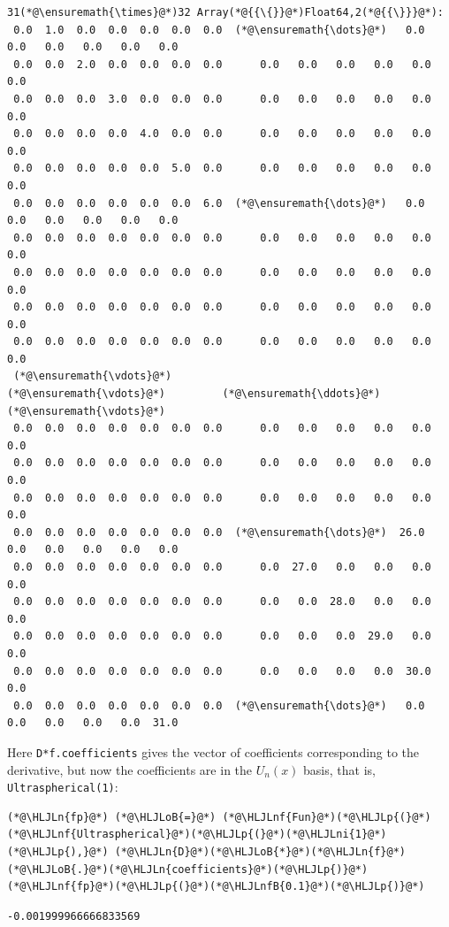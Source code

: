 \documentclass[12pt,a4paper]{article}
\newcommand{\HLJLn}[1]{#1}
\newcommand{\HLJLnf}[1]{\textcolor[RGB]{66,102,213}{#1}}
\newcommand{\HLJLnfB}[1]{\textcolor[RGB]{59,151,46}{#1}}
\newcommand{\HLJLni}[1]{\textcolor[RGB]{59,151,46}{#1}}
\newcommand{\HLJLoB}[1]{\textcolor[RGB]{102,102,102}{\textbf{#1}}}
\newcommand{\HLJLp}[1]{#1}
\begin{document}
\begin{lstlisting}
31(*@\ensuremath{\times}@*)32 Array(*@{{\{}}@*)Float64,2(*@{{\}}}@*):
 0.0  1.0  0.0  0.0  0.0  0.0  0.0  (*@\ensuremath{\dots}@*)   0.0   0.0   0.0   0.0   0.0   0.0
 0.0  0.0  2.0  0.0  0.0  0.0  0.0      0.0   0.0   0.0   0.0   0.0   0.0
 0.0  0.0  0.0  3.0  0.0  0.0  0.0      0.0   0.0   0.0   0.0   0.0   0.0
 0.0  0.0  0.0  0.0  4.0  0.0  0.0      0.0   0.0   0.0   0.0   0.0   0.0
 0.0  0.0  0.0  0.0  0.0  5.0  0.0      0.0   0.0   0.0   0.0   0.0   0.0
 0.0  0.0  0.0  0.0  0.0  0.0  6.0  (*@\ensuremath{\dots}@*)   0.0   0.0   0.0   0.0   0.0   0.0
 0.0  0.0  0.0  0.0  0.0  0.0  0.0      0.0   0.0   0.0   0.0   0.0   0.0
 0.0  0.0  0.0  0.0  0.0  0.0  0.0      0.0   0.0   0.0   0.0   0.0   0.0
 0.0  0.0  0.0  0.0  0.0  0.0  0.0      0.0   0.0   0.0   0.0   0.0   0.0
 0.0  0.0  0.0  0.0  0.0  0.0  0.0      0.0   0.0   0.0   0.0   0.0   0.0
 (*@\ensuremath{\vdots}@*)                        (*@\ensuremath{\vdots}@*)         (*@\ensuremath{\ddots}@*)                           (*@\ensuremath{\vdots}@*)        
 0.0  0.0  0.0  0.0  0.0  0.0  0.0      0.0   0.0   0.0   0.0   0.0   0.0
 0.0  0.0  0.0  0.0  0.0  0.0  0.0      0.0   0.0   0.0   0.0   0.0   0.0
 0.0  0.0  0.0  0.0  0.0  0.0  0.0      0.0   0.0   0.0   0.0   0.0   0.0
 0.0  0.0  0.0  0.0  0.0  0.0  0.0  (*@\ensuremath{\dots}@*)  26.0   0.0   0.0   0.0   0.0   0.0
 0.0  0.0  0.0  0.0  0.0  0.0  0.0      0.0  27.0   0.0   0.0   0.0   0.0
 0.0  0.0  0.0  0.0  0.0  0.0  0.0      0.0   0.0  28.0   0.0   0.0   0.0
 0.0  0.0  0.0  0.0  0.0  0.0  0.0      0.0   0.0   0.0  29.0   0.0   0.0
 0.0  0.0  0.0  0.0  0.0  0.0  0.0      0.0   0.0   0.0   0.0  30.0   0.0
 0.0  0.0  0.0  0.0  0.0  0.0  0.0  (*@\ensuremath{\dots}@*)   0.0   0.0   0.0   0.0   0.0  31.0
\end{lstlisting}


Here \texttt{D*f.coefficients} gives the vector of coefficients corresponding to the derivative, but now the coefficients are in the $U_n(x)$ basis, that is, \texttt{Ultraspherical(1)}:


\begin{lstlisting}
(*@\HLJLn{fp}@*) (*@\HLJLoB{=}@*) (*@\HLJLnf{Fun}@*)(*@\HLJLp{(}@*)(*@\HLJLnf{Ultraspherical}@*)(*@\HLJLp{(}@*)(*@\HLJLni{1}@*)(*@\HLJLp{),}@*) (*@\HLJLn{D}@*)(*@\HLJLoB{*}@*)(*@\HLJLn{f}@*)(*@\HLJLoB{.}@*)(*@\HLJLn{coefficients}@*)(*@\HLJLp{)}@*)
(*@\HLJLnf{fp}@*)(*@\HLJLp{(}@*)(*@\HLJLnfB{0.1}@*)(*@\HLJLp{)}@*)
\end{lstlisting}

\begin{lstlisting}
-0.001999966666833569
\end{lstlisting}
\end{document}
